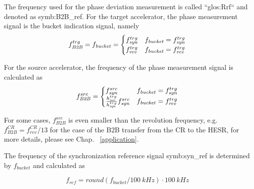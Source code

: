 The frequency used for the phase deviation measurement is called ``\gls{glos:Rrf}`` and denoted as \gls{symb:B2B_ref}. For the target accelerator, the phase measurement signal is the bucket indication signal, namely 
\begin{eqnarray}
f_{\mathit{B2B}}^{trg}=f_{\mathit{bucket}}=
\begin{cases}
f_{\mathit{syn}}^{trg} &f_{\mathit{bucket}}=f_{\mathit{syn}}^{trg}\cr

f_{\mathit{rev}}^{trg} &f_{\mathit{bucket}}=f_{\mathit{rev}}^{trg}
\end{cases}
\end{eqnarray} 

For the source accelerator, the frequency of the phase measurement signal is calculated as
\begin{eqnarray}
f_{\mathit{B2B}}^{src}=
\begin{cases}
f_{\mathit{syn}}^{src} &f_{\mathit{bucket}}=f_{\mathit{syn}}^{trg}\cr

\frac{h_{\mathit{rev}}^{trg}}{h_{\mathit{syn}}^{trg}}f_{\mathit{syn}}^{src} &f_{\mathit{bucket}}=f_{\mathit{rev}}^{trg}
\end{cases}
\end{eqnarray}

For some cases, $f_{\mathit{B2B}}^{src}$ is even smaller than the revolution frequency, e.g. $f_{\mathit{B2B}}^{CR}=f_{\mathit{rev}}^{CR}/13$ for the case of the B2B transfer from the CR to the HESR, for more details, please see Chap. ~\ref{application}.

The frequency of the synchronization reference signal \gls{symb:syn_ref} is determined by $f_{\mathit{bucket}}$ and calculated as

\begin{equation}
\label{round}
	f_\mathit{ref}=\textit{round} (f_{\mathit{bucket}}/\SI{100}{kHz})\cdot \SI{100}{kHz}
\end{equation}

